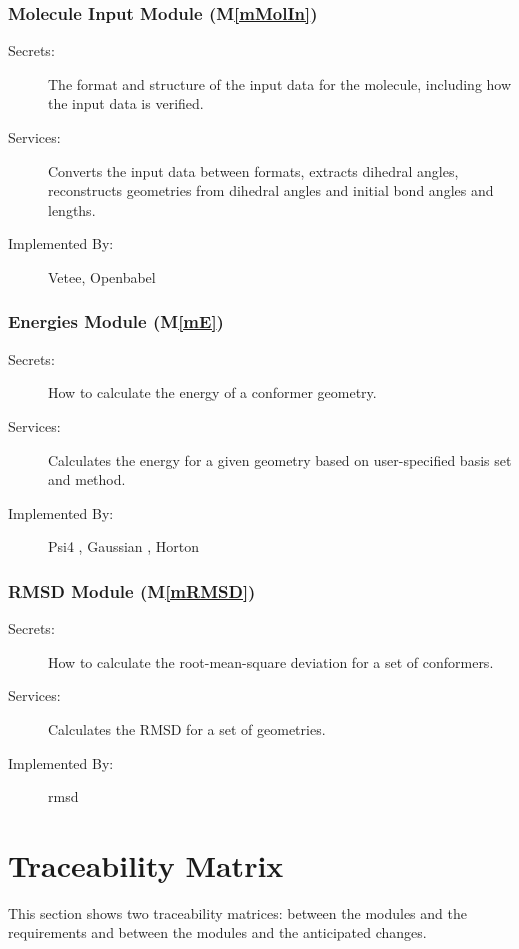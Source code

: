 \documentclass[12pt, titlepage]{article}
\newcommand{\mref}[1]{M\ref{#1}}
\begin{document}
\subsubsection{Molecule Input Module (\mref{mMolIn})}
\begin{description}
	\item[Secrets:] The format and structure of the input data for the 
	molecule, including how the input data is verified.
	\item[Services:] Converts the input data between formats, extracts dihedral 
	angles, reconstructs geometries from dihedral angles and initial bond 
	angles and lengths.
	\item[Implemented By:] Vetee, Openbabel \citet{obabel} \citet{obabel-web}
\end{description}

\subsubsection{Energies Module (\mref{mE})}
\begin{description}
	\item[Secrets:] How to calculate the energy of a conformer geometry.
	\item[Services:] Calculates the energy for a given geometry based on 
	user-specified basis set and method. 
	\item[Implemented By:] Psi4 \citet{psi4}, Gaussian \citet{g16}, 
	Horton \citet{horton}
\end{description}

\subsubsection{RMSD Module (\mref{mRMSD})}
\begin{description}
	\item[Secrets:] How to calculate the root-mean-square deviation for a set 
	of conformers.
	\item[Services:] Calculates the RMSD for a set of geometries.
	\item[Implemented By:] rmsd\citet{rmsd-charnley}
\end{description}


\section{Traceability Matrix} \label{SecTM}

This section shows two traceability matrices: between the modules and the
requirements and between the modules and the anticipated changes.
\end{document}
